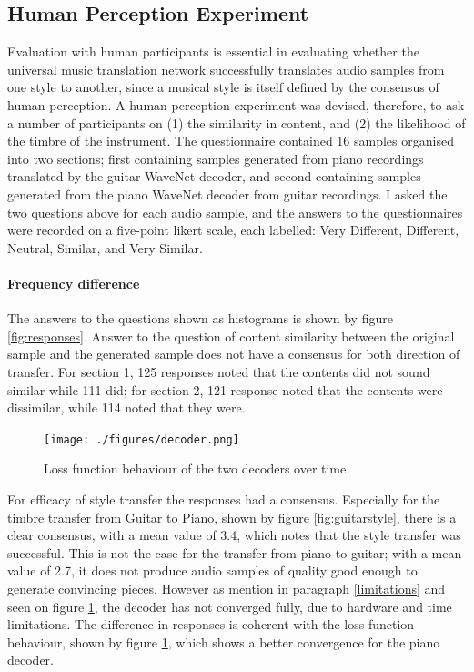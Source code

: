 \documentclass[12pt,a4paper,]{report}
\begin{document}
\hypertarget{human-perception-experiment}{%
\subsection{Human Perception
Experiment}\label{human-perception-experiment}}

Evaluation with human participants is essential in evaluating whether
the universal music translation network successfully translates audio
samples from one style to another, since a musical style is itself
defined by the consensus of human perception. A human perception
experiment was devised, therefore, to ask a number of participants on
(1) the similarity in content, and (2) the likelihood of the timbre of
the instrument. The questionnaire contained 16 samples organised into
two sections; first containing samples generated from piano recordings
translated by the guitar WaveNet decoder, and second containing samples
generated from the piano WaveNet decoder from guitar recordings. I asked
the two questions above for each audio sample, and the answers to the
questionnaires were recorded on a five-point likert scale, each
labelled: Very Different, Different, Neutral, Similar, and Very Similar.

\paragraph{Frequency difference}

The answers to the questions shown as histograms is shown by figure
\ref{fig:responses}. Answer to the question of content similarity
between the original sample and the generated sample does not have a
consensus for both direction of transfer. For section 1, 125 responses
noted that the contents did not sound similar while 111 did; for section
2, 121 response noted that the contents were dissimilar, while 114 noted
that they were.

\begin{figure}[!h]
    \texttt{[image: ./figures/decoder.png]}
    \centering
    \caption{Loss function behaviour of the two decoders over time} \label{fig:decoder}
\end{figure}

For efficacy of style transfer the responses had a consensus. Especially
for the timbre transfer from Guitar to Piano, shown by figure
\ref{fig:guitarstyle}, there is a clear consensus, with a mean value of
3.4, which notes that the style transfer was successful. This is not the
case for the transfer from piano to guitar; with a mean value of 2.7, it
does not produce audio samples of quality good enough to generate
convincing pieces. However as mention in paragraph \ref{limitations} and
seen on figure \ref{fig:decoder}, the decoder has not converged fully,
due to hardware and time limitations. The difference in responses is
coherent with the loss function behaviour, shown by figure
\ref{fig:decoder}, which shows a better convergence for the piano
decoder.
\end{document}
